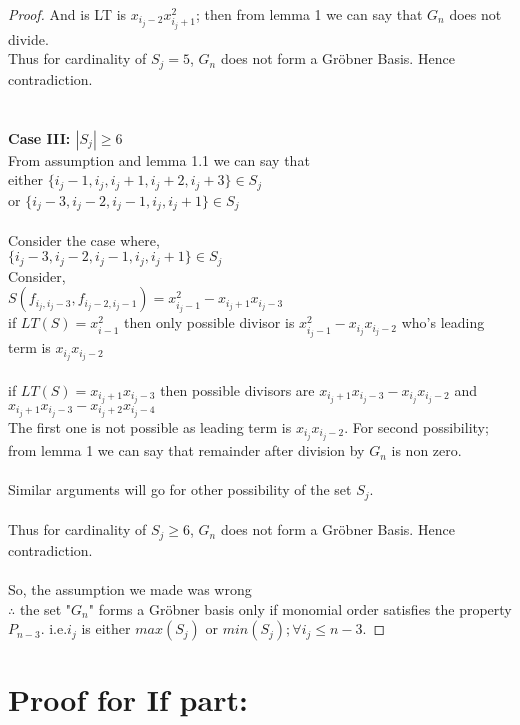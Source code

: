 \documentclass[12pt,a4paper]{article}
\theoremstyle{definition}
\begin{document}
\begin{proof}
And is LT is $x_{i_{j}-2}x_{i_{j}+1}^{2}$; then from lemma 1 we can say that $G_{n}$ does not divide.
\\ Thus for cardinality of $S_{j}=5$,  $G_{n}$ does not form a Gr\"{o}bner Basis.
Hence contradiction.
\\
\\
\\
{\bf \noindent Case III: $|S_{j}|\geq 6$}\\
From assumption and lemma 1.1 we can say that\\
either $\{i_j-1, i_j,i_j+1,i_j+2,i_j+3\} \in S_{j}$ \\
or $\{i_j-3,i_j-2,i_j-1,i_j,i_j+1\} \in S_{j}$ 
\\
\\
\noindent Consider the case where,\\ $\{i_j-3,i_j-2,i_j-1,i_j,i_j+1\} \in S_{j}$\\

\noindent Consider,\\
$S(f_{i_{j},i_{j}-3}, f_{i_{j}-2,i_{j}-1})=x_{i_{j}-1}^2-x_{i_{j}+1}x_{i_{j}-3}$\\
if $LT(S)=x_{i-1}^2$ then only possible divisor is $x^{2}_{i_{j}-1}-x_{i_{j}}x_{i_{j}-2}$ who's leading term is $x_{i_{j}}x_{i_{j}-2}$\\
\\
if $LT(S)=x_{i_{j}+1}x_{i_{j}-3}$ then possible divisors are $x_{i_{j}+1}x_{i_{j}-3}-x_{i_{j}}x_{i_{j}-2}$ and $x_{i_{j}+1}x_{i_{j}-3}-x_{i_{j}+2}x_{i_{j}-4}$\\
The first one is not possible as leading term is $x_{i_{j}}x_{i_{j}-2}$.
For second possibility; from lemma 1 we can say that remainder after division by $G_{n}$ is non zero.\\
\\
Similar arguments will go for other possibility of the set $S_{j}$.\\
\\Thus for cardinality of $S_{j}\geq 6$,  $G_{n}$ does not form a Gr\"{o}bner Basis.
Hence contradiction.\\
\\

So, the assumption we made was wrong \\
$\therefore$ the set "$G_{n}$" forms a Gr\"{o}bner basis only if monomial order satisfies the property $P_{n-3}$. i.e.$i_{j}$ is either $max(S_{j})$ or $min(S_{j}); \forall i_{j}\leq n-3$.
\end{proof}

\section*{Proof for If part:}
\theoremstyle{definition}
\end{document}
